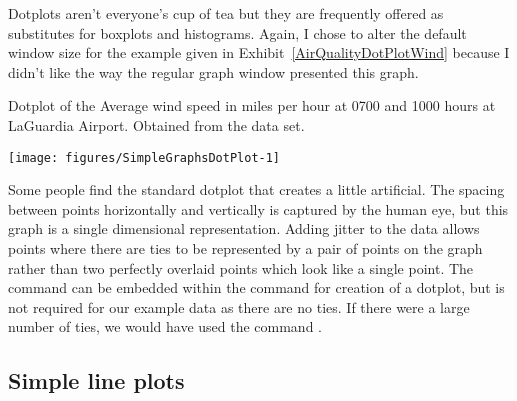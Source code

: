 Dotplots aren't everyone's cup of tea but they are frequently offered as substitutes for boxplots and histograms. Again, I chose to alter the default window size for the example given in Exhibit~\ref{AirQualityDotPlotWind} 
because I didn't like the way the regular graph window presented this graph. 
\begin{exhibit} 
\begin{center} 
\caption{Dotplot of the Average wind speed in miles per hour at 0700 and 1000 hours at LaGuardia Airport. Obtained from the  data set.} 
\label{AirQualityDotPlotWind} 
\begin{Schunk}

\texttt{[image: figures/SimpleGraphsDotPlot-1]} \end{Schunk}
\end{center} 
\end{exhibit} 
 
Some people find the standard dotplot that \R{} creates a little artificial. The spacing between points horizontally and vertically is captured by the human eye, but this graph is a single dimensional representation. Adding jitter to the data allows points where there are ties to be represented by a pair of points on the graph rather than two perfectly overlaid points which look like a single point. The  command can be embedded within the command for creation of a dotplot, but is not required for our example data as there are no ties. If there were a large number of ties, we would have used the command . 
 
 
 
\subsection{Simple line plots} 
 

